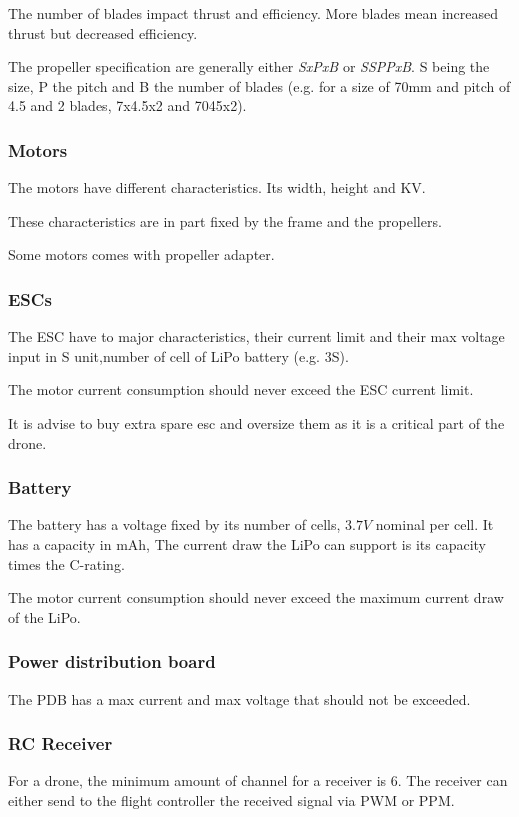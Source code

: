 The number of blades impact thrust and efficiency. More blades mean increased thrust but decreased efficiency.

The propeller specification are generally either \emph{SxPxB} or \emph{SSPPxB}.
S being the size, P the pitch and B the number of blades
(e.g. for a size of 70mm and pitch of 4.5 and 2 blades, 7x4.5x2 and 7045x2).

\subsubsection{Motors}
The motors have different characteristics. Its width, height and KV.

These characteristics are in part fixed by the frame and the propellers.

Some motors comes with propeller adapter.

\subsubsection{ESCs}
The ESC have to major characteristics, their current limit and their max voltage input in S unit,number of cell of LiPo battery (e.g. 3S).

The motor current consumption should never exceed the ESC current limit.

It is advise to buy extra spare esc and oversize them as it is a critical part of the drone.

\subsubsection{Battery}
The battery has a voltage fixed by its number of cells, $3.7V$ nominal per cell.
It has a capacity in mAh,
The current draw the LiPo can support is its capacity times the C-rating.

The motor current consumption should never exceed the maximum current draw of the LiPo.

\subsubsection{Power distribution board}
The PDB has a max current and max voltage that should not be exceeded.

\subsubsection{RC Receiver}
For a drone, the minimum amount of channel for a receiver is 6.
The receiver can either send to the flight controller the received signal via PWM or PPM.

